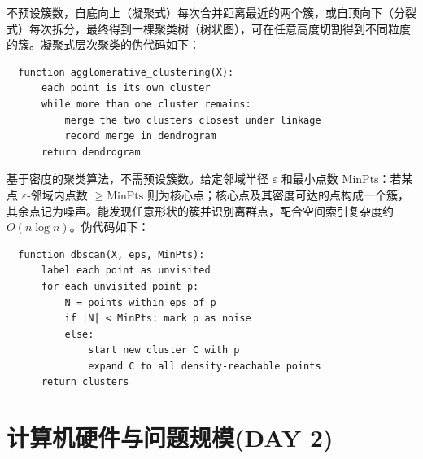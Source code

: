 \documentclass[12pt]{article}
\begin{document}
\begin{defn}[层次聚类]
  不预设簇数，自底向上（凝聚式）每次合并距离最近的两个簇，或自顶向下（分裂式）每次拆分，最终得到一棵聚类树（树状图），可在任意高度切割得到不同粒度的簇。凝聚式层次聚类的伪代码如下：
  \begin{verbatim}
  function agglomerative_clustering(X):
      each point is its own cluster
      while more than one cluster remains:
          merge the two clusters closest under linkage
          record merge in dendrogram
      return dendrogram
  \end{verbatim}
\end{defn}
\begin{defn}[DBSCAN]
  基于密度的聚类算法，不需预设簇数。给定邻域半径 $\varepsilon$ 和最小点数 $\mathrm{MinPts}$：若某点 $\varepsilon$-邻域内点数 $\ge \mathrm{MinPts}$ 则为核心点；核心点及其密度可达的点构成一个簇，其余点记为噪声。能发现任意形状的簇并识别离群点，配合空间索引复杂度约 $O(n\log n)$。伪代码如下：
  \begin{verbatim}
  function dbscan(X, eps, MinPts):
      label each point as unvisited
      for each unvisited point p:
          N = points within eps of p
          if |N| < MinPts: mark p as noise
          else:
              start new cluster C with p
              expand C to all density-reachable points
      return clusters
  \end{verbatim}
\end{defn}
\section{计算机硬件与问题规模(DAY 2)}
\end{document}

